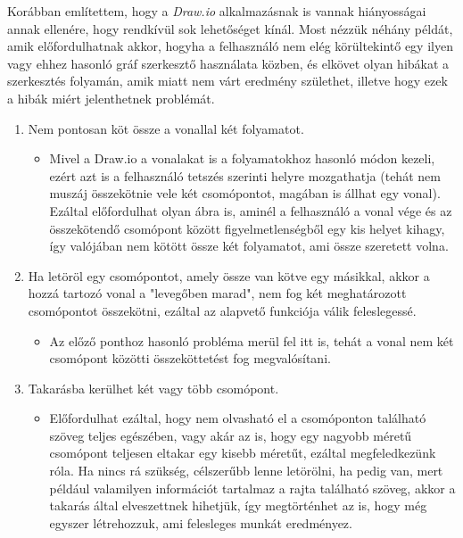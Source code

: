 
Korábban említettem, hogy a \textit{Draw.io} alkalmazásnak is vannak hiányosságai annak ellenére, hogy rendkívül sok lehetőséget kínál. Most nézzük néhány példát, amik előfordulhatnak akkor, hogyha a felhasználó nem elég körültekintő egy ilyen vagy ehhez hasonló gráf szerkesztő használata közben, és elkövet olyan hibákat a szerkesztés folyamán, amik miatt nem várt eredmény születhet, illetve hogy ezek a hibák miért jelenthetnek problémát.

\begin{enumerate}
\item Nem pontosan köt össze a vonallal két folyamatot.

\begin{itemize}
\item Mivel a Draw.io a vonalakat is a folyamatokhoz hasonló módon kezeli, ezért azt is a felhasználó tetszés szerinti helyre mozgathatja (tehát nem muszáj összekötnie vele két csomópontot, magában is állhat egy vonal). Ezáltal előfordulhat olyan ábra is, aminél a felhasználó a vonal vége és az összekötendő csomópont között figyelmetlenségből egy kis helyet kihagy, így valójában nem kötött össze két folyamatot, ami össze szeretett volna.
\end{itemize}

\item Ha letöröl egy csomópontot, amely össze van kötve egy másikkal, akkor a hozzá tartozó vonal a "levegőben marad", nem fog két meghatározott csomópontot összekötni, ezáltal az alapvető funkciója válik feleslegessé.

\begin{itemize}
\item Az előző ponthoz hasonló probléma merül fel itt is, tehát a vonal nem két csomópont közötti összeköttetést fog megvalósítani.
\end{itemize}

\item Takarásba kerülhet két vagy több csomópont.

\begin{itemize}
\item Előfordulhat ezáltal, hogy nem olvasható el a csomóponton található szöveg teljes egészében, vagy akár az is, hogy egy nagyobb méretű csomópont teljesen eltakar egy kisebb méretűt, ezáltal megfeledkezünk róla. Ha nincs rá szükség, célszerűbb lenne letörölni, ha pedig van, mert például valamilyen információt tartalmaz a rajta található szöveg, akkor a takarás által elveszettnek hihetjük, így megtörténhet az is, hogy még egyszer létrehozzuk, ami felesleges munkát eredményez.
\end{itemize}


\end{enumerate}
